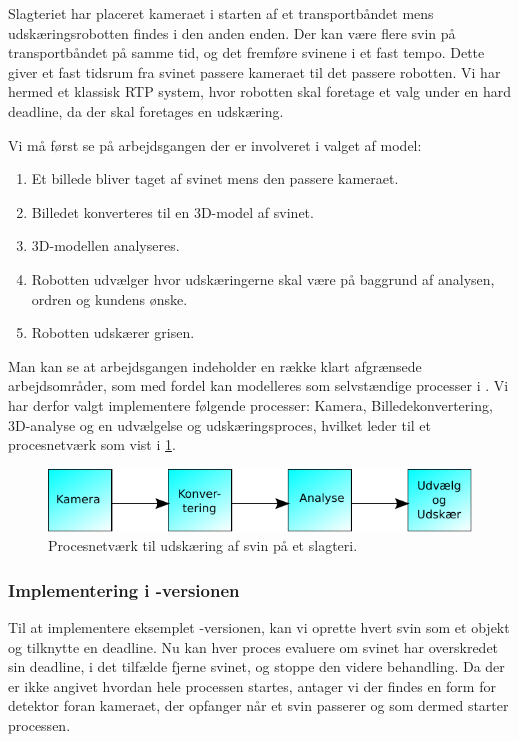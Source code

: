 Slagteriet har placeret kameraet i starten af et transportbåndet mens udskæringsrobotten findes i den anden enden. Der kan være flere svin på transportbåndet på samme tid, og det fremføre svinene i et fast tempo. Dette giver et fast tidsrum fra svinet passere kameraet til det passere robotten. Vi har hermed et klassisk RTP system, hvor robotten skal foretage et valg under en hard deadline, da der skal foretages en udskæring.

Vi må først se på arbejdsgangen der er involveret i valget af model:
\begin{enumerate}
\tightlist
	\item Et billede bliver taget af svinet mens den passere kameraet.
	\item Billedet konverteres til en 3D-model af svinet.
	\item 3D-modellen analyseres.
	\item Robotten udvælger hvor udskæringerne skal være på baggrund af analysen, ordren og kundens ønske.
	\item Robotten udskærer grisen.
\end{enumerate}

Man kan se at arbejdsgangen indeholder en  række klart afgrænsede arbejdsområder, som med fordel kan modelleres som selvstændige processer i \pycsp.  Vi har derfor valgt implementere følgende processer: Kamera, Billedekonvertering, 3D-analyse og en udvælgelse og udskæringsproces, hvilket leder til et procesnetværk som vist i \cref{fig:pig-network}.

\begin{figure}
 \begin{center}
  \includegraphics[scale=1]{images/pig-network}
	\caption{Procesnetværk til udskæring af svin på et slagteri.}
	\label{fig:pig-network}
\end{center}
\end{figure}

\subsubsection*{Implementering i -versionen}
Til at implementere eksemplet -versionen, kan vi oprette hvert svin som et objekt og tilknytte en deadline. Nu kan hver proces evaluere om svinet har overskredet sin deadline, i det tilfælde fjerne svinet, og stoppe den videre behandling. Da der er ikke angivet hvordan hele processen startes,  antager vi der findes en form for detektor foran kameraet, der opfanger når et svin passerer og som dermed starter processen. 

